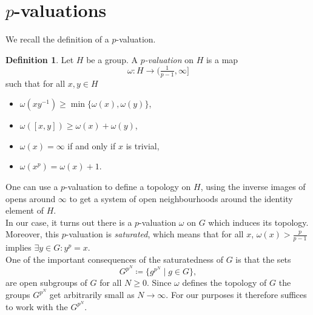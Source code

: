 \documentclass[11pt, oneside]{article}
\theoremstyle{definition}
\newtheorem{definition}{Definition}
\begin{document}
	\section{$p$-valuations}
	We recall the definition of a $p$-valuation.
	\begin{definition}
		Let $H$ be a group. A \emph{$p$-valuation} on $H$ is a map $$\omega\colon H\to(\tfrac1{p-1},\infty]$$ such that for all $x,y\in H$\begin{itemize}
			\item$\omega(xy^{-1})\geq\min\{\omega(x),\omega(y)\}$,
			\item$\omega([x,y])\geq\omega(x)+\omega(y)$,
			\item$\omega(x)=\infty$ if and only if $x$ is trivial,
			\item$\omega(x^p)=\omega(x)+1$.
		\end{itemize}
	\end{definition}
	One can use a $p$-valuation to define a topology on $H$, using the inverse images of opens around $\infty$ to get a system of open neighbourhoods around the identity element of $H$.\\
	In our case, it turns out there is a $p$-valuation $\omega$ on $G$ which induces its topology. Moreover, this $p$-valuation is \emph{saturated}, which means that for all $x$, $\omega(x)>\frac p{p-1}$ implies $\exists y\in G\colon y^p=x$.\\
	One of the important consequences of the saturatedness of $G$ is that the sets $$G^{p^N}\coloneqq\{g^{p^N}\mid g\in G\},$$ are open subgroups of $G$ for all $N\geq0$. Since $\omega$ defines the topology of $G$ the groups $G^{p^N}$ get arbitrarily small as $N\to\infty$. For our purposes it therefore suffices to work with the $G^{p^N}$.\\
	
\end{document}

